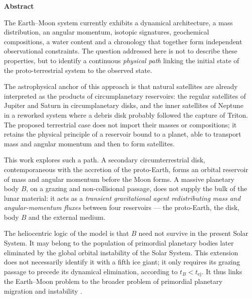 \documentclass[11pt,a4paper,openany]{report}
\begin{document}
\thispagestyle{plain}
\begin{center}{\Large\bfseries Abstract}\end{center}
\medskip

The Earth--Moon system currently exhibits a dynamical architecture, a mass distribution, an
angular momentum, isotopic signatures, geochemical compositions, a water content and a chronology
that together form independent observational constraints. The question addressed here is not to
describe these properties, but to identify a continuous \emph{physical path} linking the initial
state of the proto-terrestrial system to the observed state.

The astrophysical anchor of this approach is that natural satellites are already interpreted as
the products of circumplanetary reservoirs: the regular satellites of Jupiter and Saturn in
circumplanetary disks, and the inner satellites of Neptune in a reworked system where a debris
disk probably followed the capture of Triton. The proposed terrestrial case does not import their
masses or compositions; it retains the physical principle of a reservoir bound to a planet, able
to transport mass and angular momentum and then to form satellites.

This work explores such a path. A secondary circumterrestrial disk, contemporaneous with the
accretion of the proto-Earth, forms an orbital reservoir of mass and angular momentum before the
Moon forms. A massive planetary body $B$, on a grazing and non-collisional passage, does not
supply the bulk of the lunar material: it acts as a \emph{transient gravitational agent
redistributing mass and angular-momentum fluxes} between four reservoirs --- the proto-Earth, the
disk, body $B$ and the external medium.

The heliocentric logic of the model is that $B$ need not survive in the present Solar System. It
may belong to the population of primordial planetary bodies later eliminated by the global orbital
instability of the Solar System. This extension does not necessarily identify it with a fifth ice
giant; it only requires its grazing passage to precede its dynamical elimination, according to
$t_B<t_{\mathrm{ej}}$. It thus links the Earth--Moon problem to the broader problem of primordial
planetary migration and instability
\cite{Tsiganis2005,Gomes2005,Nesvorny2011,NesvornyMorbidelli2012,Liu2022,Clement2018}.
\end{document}
